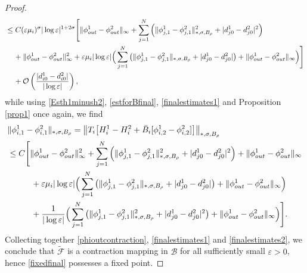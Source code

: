 \documentclass[11pt,reqno,a4paper]{amsart}
\numberwithin{equation}{section}
\newcommand{\ve}{\varepsilon}
\begin{document}
\begin{proof}
\begin{equation}
\begin{aligned}
    &\leq C(\ve\mu_i)^{\sigma}|\log\ve|^{1+2\sigma}\Bigg[\|\phi_{out}^1-\phi_{out}^2\|_{\infty}+\sum_{j=1
}^{N}\left(\|\phi^{1}_{j,1}-\phi^{2}_{j,1}\|^2_{*,\sigma,B_{\rho}}+|d^{1}_{j0}-d^{2}_{j0}|^2\right)\\
&\hspace{4mm}+\|\phi_{out}^1-\phi_{out}^2\|^2_{\infty}
+\ve\mu_i|\log\ve|\Big(\sum_{j=1}^{N}\big(\|\phi^{1}_{j,1}-\phi^{2}_{j,1}\|_{*,\sigma,B_{\rho}}+|d^{1}_{j0}-d^{2}_{j0}|\big)+\|\phi_{out}^1-\phi_{out}^2\|_{\infty}\Big)\Bigg]\\
&\hspace{4mm}+\mathcal{O}\left(\frac{|d_{i0}^1-d_{i0}^2|}{|\log\ve|}\right),
\end{aligned}
\end{equation}
while using \eqref{Esth1minush2}, \eqref{estforBfinal}, \eqref{finalestimates1}  and Proposition \ref{prop1} once again, we find 
\begin{equation}\label{finalestimates2}
\begin{aligned}
&\|\phi_{i,1}^1-\phi_{i,1}^2\|_{*,\sigma,B_{\rho}}=\big\|T_i\big[H_i^1-H_i^2+\bar{B}_i[\phi_{i,2}^1-\phi_{i,2}^2]\big]\big\|_{*,\sigma,B_{\rho}}\\
&\leq C\Bigg[\|\phi_{out}^1-\phi_{out}^2\|^2_{\infty}+\sum_{j=1}^{N}\Big(\|\phi^{1}_{j,1}-\phi^{2}_{j,1}\|^{2}_{*,\sigma,B_{\rho}}+|d^{1}_{j0}-d^{2}_{j0}|^2\Big)+\|\phi_{out}^1-\phi^2_{out}\|_{\infty}\\&\hspace{10mm}+\ve\mu_i|\log\ve|\Big(\sum_{j=1}^{N}\big(\|\phi^{1}_{j,1}-\phi^{2}_{j,1}\|_{*,\sigma,B_{\rho}}+|d^{1}_{j0}-d^{2}_{j0}|\big)+\|\phi_{out}^1-\phi^2_{out}\|_{\infty}\Big)\\
&\hspace{10mm}+\frac{1}{|\log\ve|}\Big(\sum_{j=1}^{N}\big(\|\phi^{1}_{j,1}-\phi^{2}_{j,1}\|^{2}_{*,\sigma,B_{\rho}}+|d^{1}_{j0}-d^{2}_{j0}|^2\big)+\|\phi_{out}^1-\phi_{out}^2\|_{\infty}\Big)\Bigg].
\end{aligned}
\end{equation}
Collecting together \eqref{phioutcontraction}, \eqref{finalestimates1} and \eqref{finalestimates2}, we  conclude that $\widetilde{\mathcal{F}}$ is a contraction mapping in $\mathcal{B}$ for all sufficiently small $\ve>0$, hence \eqref{fixedfinal} possesses a fixed point.
\end{proof}
\end{document}
